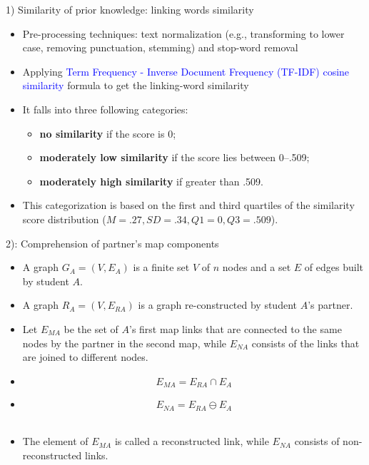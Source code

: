 \begin{frame}{1) Similarity of prior knowledge: linking words similarity}
    \begin{itemize}
        \item Pre-processing techniques: text normalization 
              (e.g., transforming to lower case, removing punctuation, stemming) 
              and stop-word removal
        \item Applying \textcolor{blue}{Term Frequency - Inverse Document Frequency (TF-IDF) cosine similarity} formula to get the linking-word similarity
        \item It falls into three following categories: 
        \begin{itemize}
            \item \textbf{no similarity} if the score is 0; 
            \item \textbf{moderately low similarity} if the score lies between 0--.509;
            \item \textbf{moderately high similarity} if greater than .509.
        \end{itemize} 
        \item This categorization is based on the first and third quartiles 
        of the similarity score distribution ($M = .27, SD = .34, Q1 = 0, Q3 = .509$).
    \end{itemize}
\end{frame}

\begin{frame}{2): Comprehension of partner's map components}

\begin{itemize}
    \item <+-> A graph $G_A = (V, E_A)$ is a finite set $V$ of $n$ nodes and a set $E$ of edges built by student $A$. 
    \item <+-> A graph $R_A = (V, E_{RA})$ is a graph re-constructed by student $A$'s partner. 
    \item <+-> Let $E_{MA}$ be the set of $A$'s first map links that are connected to the same nodes by the partner in the second map, while $E_{NA}$ consists of the links that are joined to different nodes.
    \item <+-> \begin{equation}
            E_{MA} = E_{RA} \cap E_A 
    \end{equation}
    \item <+-> \begin{equation}
            E_{NA} = E_{RA} \ominus E_A
    \end{equation}
    \\
    \item <+-> The element of $E_{MA}$ is called a reconstructed link, while $E_{NA}$ consists of non-reconstructed links.
\end{itemize}

\end{frame}

